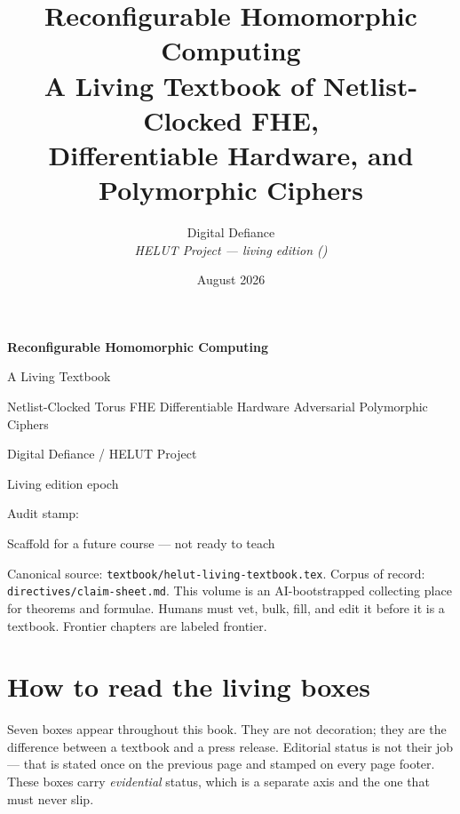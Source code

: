 \documentclass[11pt,oneside,openany]{book}
\title{\textbf{Reconfigurable Homomorphic Computing}\\
\large A Living Textbook of Netlist-Clocked FHE,\\
Differentiable Hardware, and Polymorphic Ciphers}
\author{Digital Defiance\\
\textit{HELUT Project --- living edition \corpusedition{} (\livingepoch)}}
\date{August 2026}
\begin{document}
\frontmatter

\begin{titlepage}
\thispagestyle{empty}
\centering
\vspace*{2cm}
{\Huge\bfseries Reconfigurable Homomorphic Computing\par}
\vspace{1.2em}
{\Large A Living Textbook\par}
\vspace{0.8em}
{\large Netlist-Clocked Torus FHE \textperiodcentered{}
Differentiable Hardware \textperiodcentered{}
Adversarial Polymorphic Ciphers\par}
\vfill
{\large Digital Defiance / HELUT Project\par}
\vspace{0.5em}
{\large Living edition \corpusedition{} \textperiodcentered{} epoch \livingepoch\par}
\vspace{0.2em}
{\small Audit stamp: \texttt{\gitstamp} \textperiodcentered{} \audittime\par}
\vspace{0.3em}
{\large Scaffold for a future course --- not ready to teach\par}
\vfill
{\small Canonical source: \texttt{textbook/helut-living-textbook.tex}.
Corpus of record: \texttt{directives/claim-sheet.md}.
This volume is an AI-bootstrapped collecting place for theorems and
formulae. Humans must vet, bulk, fill, and edit it before it is a
textbook. Frontier chapters are labeled frontier.\par}
\end{titlepage}

\draftnotice

\chapter*{How to read the living boxes}

Seven boxes appear throughout this book.
They are not decoration; they are the difference between a textbook and a press release.
Editorial status is not their job --- that is stated once on the previous page and
stamped on every page footer. These boxes carry \emph{evidential} status, which is
a separate axis and the one that must never slip.

\end{document}
